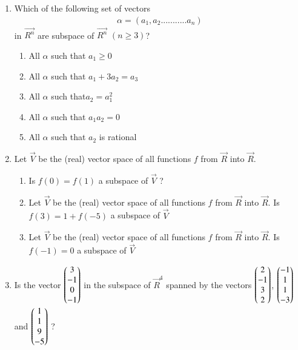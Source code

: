 \renewcommand{\theequation}{\theenumi}
\renewcommand{\thefigure}{\theenumi}
\begin{enumerate}[label=\thesubsection.\arabic*.,ref=\thesubsection.\theenumi]
%
\item Which of the following set of vectors
\begin{align}\alpha=(a_1,a_2...........a_n)\nonumber\end{align} in $\vec{R^n}$ are subspace of $\vec{R^n}$ $(n\geq3)$?\\
\begin{enumerate}
\item All $\alpha$ such that $a_1\geq0$\\
\item All $\alpha$ such that $a_1+3a_2=a_3$\\
\item All $\alpha$ such that$a_2=a_1^{2}$\\
\item All $\alpha$ such that $a_1a_2=0$\\
\item All $\alpha$ such that $a_2$ is rational
\end{enumerate}
%
\solution

\item Let $\vec{V}$ be the (real) vector space of all functions $f$
from $\vec{R}$ into $\vec{R}$. 
%
\begin{enumerate}
\item Is $f(0) = f(1)$ a
subspace of $\vec{V}$ ?
\\
\solution

\item Let $\vec{V}$ be the (real) vector space of all functions $f$
from $\vec{R}$ into $\vec{R}$. Is $f(3)=1+f(-5)$ a
subspace of $\vec{V}$ 
%
\\
\solution

%
\item Let $\vec{V}$ be the (real) vector space of all functions $f$
from $\vec{R}$ into $\vec{R}$. Is $f(-1) = 0 $ a
subspace of $\vec{V}$ 
%
\\
\solution

\end{enumerate}
\item Is the vector $\begin{pmatrix}3\\-1\\0\\-1\end{pmatrix}$ in the subspace of $\vec{R}^{4}$ spanned by the vectors $\begin{pmatrix}2\\-1\\3\\2\end{pmatrix}$, $\begin{pmatrix}-1\\1\\1\\-3\end{pmatrix}$ and $\begin{pmatrix}1\\1\\9\\-5\end{pmatrix}$ ?

\end{enumerate}
